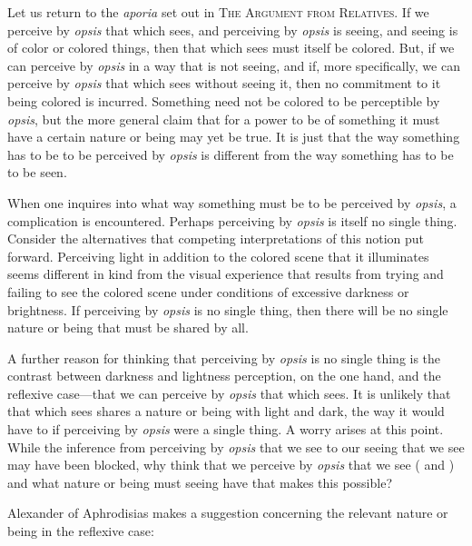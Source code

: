 Let us return to the \emph{aporia} set out in \textsc{The Argument from Relatives}. If we perceive by \emph{opsis} that which sees, and perceiving by \emph{opsis} is seeing, and seeing is of color or colored things, then that which sees must itself be colored. But, if we can perceive by \emph{opsis} in a way that is not seeing, and if, more specifically, we can perceive by \emph{opsis} that which sees without seeing it, then no commitment to it being colored is incurred. Something need not be colored to be perceptible by \emph{opsis}, but the more general claim that for a power to be of something it must have a certain nature or being may yet be true. It is just that the way something has to be to be perceived by \emph{opsis} is different from the way something has to be to be seen.

When one inquires into what way something must be to be perceived by \emph{opsis}, a complication is encountered. Perhaps perceiving by \emph{opsis} is itself no single thing. Consider the alternatives that competing interpretations of this notion put forward. Perceiving light in addition to the colored scene that it illuminates seems different in kind from the visual experience that results from trying and failing to see the colored scene under conditions of excessive darkness or brightness. If perceiving by \emph{opsis} is no single thing, then there will be no single nature or being that must be shared by all. 

A further reason for thinking that perceiving by \emph{opsis} is no single thing is the contrast between darkness and lightness perception, on the one hand, and the reflexive case—that we can perceive by \emph{opsis} that which sees. It is unlikely that that which sees shares a nature or being with light and dark, the way it would have to if perceiving by \emph{opsis} were a single thing. A worry arises at this point. While the inference from perceiving by \emph{opsis} that we see to our seeing that we see may have been blocked, why think that we perceive by \emph{opsis} that we see (\citealt[122]{Hamlyn:1961ys} and \citealt[203]{Corkum:2010fa}) and what nature or being must seeing have that makes this possible?  

Alexander of Aphrodisias makes a suggestion concerning the relevant nature or being in the reflexive case:
\begin{quote}
	
\end{quote}


